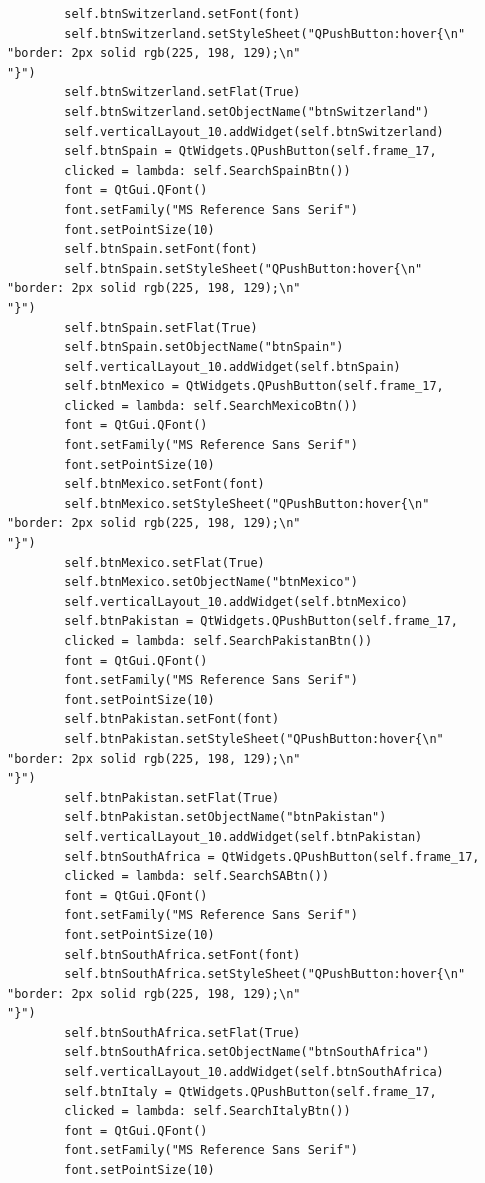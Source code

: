 \documentclass[12pt]{article}
\begin{document}
\begin{verbatim}
        self.btnSwitzerland.setFont(font)
        self.btnSwitzerland.setStyleSheet("QPushButton:hover{\n"
"border: 2px solid rgb(225, 198, 129);\n"
"}")
        self.btnSwitzerland.setFlat(True)
        self.btnSwitzerland.setObjectName("btnSwitzerland")
        self.verticalLayout_10.addWidget(self.btnSwitzerland)
        self.btnSpain = QtWidgets.QPushButton(self.frame_17, 
        clicked = lambda: self.SearchSpainBtn())
        font = QtGui.QFont()
        font.setFamily("MS Reference Sans Serif")
        font.setPointSize(10)
        self.btnSpain.setFont(font)
        self.btnSpain.setStyleSheet("QPushButton:hover{\n"
"border: 2px solid rgb(225, 198, 129);\n"
"}")
        self.btnSpain.setFlat(True)
        self.btnSpain.setObjectName("btnSpain")
        self.verticalLayout_10.addWidget(self.btnSpain)
        self.btnMexico = QtWidgets.QPushButton(self.frame_17, 
        clicked = lambda: self.SearchMexicoBtn())
        font = QtGui.QFont()
        font.setFamily("MS Reference Sans Serif")
        font.setPointSize(10)
        self.btnMexico.setFont(font)
        self.btnMexico.setStyleSheet("QPushButton:hover{\n"
"border: 2px solid rgb(225, 198, 129);\n"
"}")
        self.btnMexico.setFlat(True)
        self.btnMexico.setObjectName("btnMexico")
        self.verticalLayout_10.addWidget(self.btnMexico)
        self.btnPakistan = QtWidgets.QPushButton(self.frame_17, 
        clicked = lambda: self.SearchPakistanBtn())
        font = QtGui.QFont()
        font.setFamily("MS Reference Sans Serif")
        font.setPointSize(10)
        self.btnPakistan.setFont(font)
        self.btnPakistan.setStyleSheet("QPushButton:hover{\n"
"border: 2px solid rgb(225, 198, 129);\n"
"}")
        self.btnPakistan.setFlat(True)
        self.btnPakistan.setObjectName("btnPakistan")
        self.verticalLayout_10.addWidget(self.btnPakistan)
        self.btnSouthAfrica = QtWidgets.QPushButton(self.frame_17,
        clicked = lambda: self.SearchSABtn())
        font = QtGui.QFont()
        font.setFamily("MS Reference Sans Serif")
        font.setPointSize(10)
        self.btnSouthAfrica.setFont(font)
        self.btnSouthAfrica.setStyleSheet("QPushButton:hover{\n"
"border: 2px solid rgb(225, 198, 129);\n"
"}")
        self.btnSouthAfrica.setFlat(True)
        self.btnSouthAfrica.setObjectName("btnSouthAfrica")
        self.verticalLayout_10.addWidget(self.btnSouthAfrica)
        self.btnItaly = QtWidgets.QPushButton(self.frame_17, 
        clicked = lambda: self.SearchItalyBtn())
        font = QtGui.QFont()
        font.setFamily("MS Reference Sans Serif")
        font.setPointSize(10)

\end{verbatim}
\end{document}
